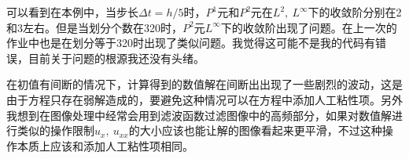 \documentclass[12pt, a4paper]{ctexart}
\begin{document}
	可以看到在本例中，当步长$\Delta t = h/5$时，$P^1$元和$P^2$元在$L^2, \  L^\infty$下的收敛阶分别在2和3左右。但是当划分个数在320时，$P^2$元$L^\infty$下的收敛阶出现了问题。在上一次的作业中也是在划分等于320时出现了类似问题。我觉得这可能不是我的代码有错误，目前关于问题的根源我还没有头绪。
	
	在初值有间断的情况下，计算得到的数值解在间断出出现了一些剧烈的波动，这是由于方程只存在弱解造成的，要避免这种情况可以在方程中添加人工粘性项。另外我想到在图像处理中经常会用到滤波函数过滤图像中的高频部分，如果对数值解进行类似的操作限制$u_x,\  u_{xx}$的大小应该也能让解的图像看起来更平滑，不过这种操作本质上应该和添加人工粘性项相同。
\end{document}
